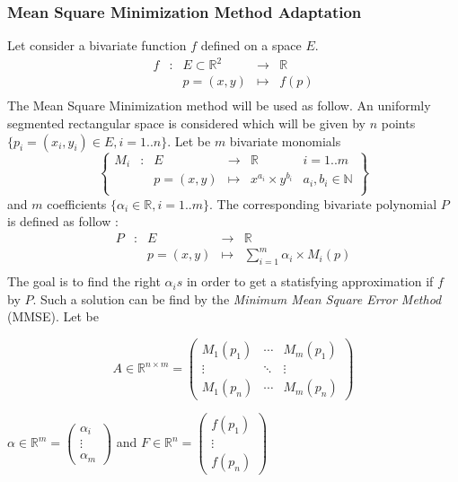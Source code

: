 \documentclass[fleqn,10pt]{SelfArx} %
\begin{document}
\subsubsection{Mean Square Minimization Method Adaptation}%
Let consider a bivariate function $f$ defined on a space $E$.
$$\begin{array}{cccccc}
	f & : & E \subset \mathbb{R}^2 & \to & \mathbb{R}\\
      &   & p = (x, y) & \mapsto & f(p) \\
	\end{array}$$
The Mean Square Minimization method will be used as follow. An uniformly segmented rectangular space is considered which will be given by $n$ points $\{p_i = (x_i, y_i) \in E , i = 1..n \}$.
Let be $m$ bivariate monomials
$$\left \{
\begin{array}{cccccc}
M_i & : & E          & \to     & \mathbb{R} & i = 1..m \\
    &   & p = (x, y) & \mapsto & x^{a_i}\times y^{b_i} & a_i, b_i \in \mathbb{N} \\
\end{array}
 \right \}$$
and $m$ coefficients $\{\alpha_i \in \mathbb{R}, i = 1..m \}$. The corresponding bivariate polynomial $P$ is defined as follow :
$$\begin{array}{cccccc}
	P & : & E  & \to & \mathbb{R}\\
      &   & p = (x, y) & \mapsto & \sum_{i=1}^{m}{\alpha_i \times M_i(p)} \\
	\end{array}$$
The goal is to find the right $\alpha_i s$ in order to get a statisfying approximation if $f$ by $P$. Such a solution can be find by the \emph{Minimum Mean Square Error Method} (MMSE). 
Let be 

$$A\in \mathbb{R}^{n\times m} = 
\begin{pmatrix}
   M_1(p_1) & \cdots & M_m(p_1)\\
   \vdots   & \ddots & \vdots  \\
   M_1(p_n) & \cdots & M_m(p_n) 
\end{pmatrix}$$

$\alpha \in \mathbb{R}^m = 
\begin{pmatrix}
   \alpha_i \\
   \vdots \\
   \alpha_m
\end{pmatrix}$
 and
$F \in \mathbb{R}^n = 
\begin{pmatrix}
   f(p_1) \\
   \vdots \\
   f(p_n)
\end{pmatrix}$
\end{document}
